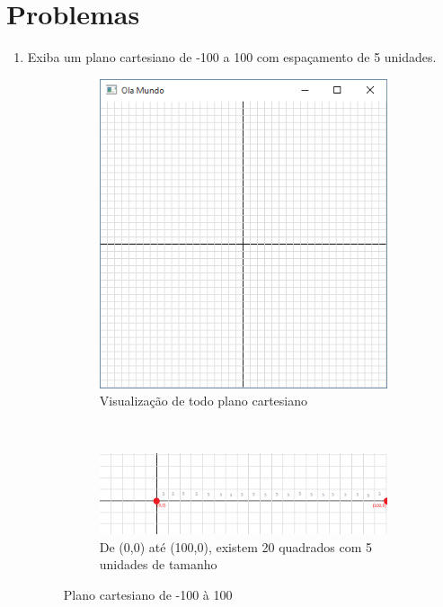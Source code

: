 \section*{Problemas}
\begin{enumerate}
\item
  Exiba um plano cartesiano de -100 a 100 com espaçamento de 5 unidades.
  \label{ex:cap01_ex1}

  \begin{figure}[!htb]
    \centering
    \begin{subfigure}[t]{0.3\textwidth}
        \centerline{\includegraphics[width=.9\textwidth]{img/cap1_ex1.png}}
        \caption{Visualização de todo plano cartesiano}
        \label{fig:cap01_ex1}
    \end{subfigure}
    ~
    \begin{subfigure}[t]{0.65\textwidth}
        \centerline{\includegraphics[width=.9\textwidth]{img/cap1_ex1_b.png}}
        \caption{De (0,0) até (100,0), existem 20 quadrados com 5 unidades de tamanho}
        \label{fig:cap01_ex1}
    \end{subfigure}
    \caption{Plano cartesiano de -100 à 100}
\end{figure}



\end{enumerate}
